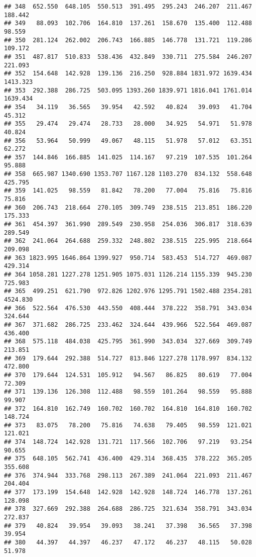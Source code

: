 \documentclass[
]{article}
\begin{document}
\begin{verbatim}
## 348  652.550  648.105  550.513  391.495  295.243  246.207  211.467  188.442
## 349   88.093  102.706  164.810  137.261  158.670  135.400  112.488   98.559
## 350  281.124  262.002  206.743  166.885  146.778  131.721  119.286  109.172
## 351  487.817  510.833  538.436  432.849  330.711  275.584  246.207  221.093
## 352  154.648  142.928  139.136  216.250  928.884 1831.972 1639.434 1413.323
## 353  292.388  286.725  503.095 1393.260 1839.971 1816.041 1761.014 1639.434
## 354   34.119   36.565   39.954   42.592   40.824   39.093   41.704   45.312
## 355   29.474   29.474   28.733   28.000   34.925   54.971   51.978   40.824
## 356   53.964   50.999   49.067   48.115   51.978   57.012   63.351   62.272
## 357  144.846  166.885  141.025  114.167   97.219  107.535  101.264   95.888
## 358  665.987 1340.690 1353.707 1167.128 1103.270  834.132  558.648  425.795
## 359  141.025   98.559   81.842   78.200   77.004   75.816   75.816   75.816
## 360  206.743  218.664  270.105  309.749  238.515  213.851  186.220  175.333
## 361  454.397  361.990  289.549  230.958  254.036  306.817  318.639  289.549
## 362  241.064  264.688  259.332  248.802  238.515  225.995  218.664  209.098
## 363 1823.995 1646.864 1399.927  950.714  583.453  514.727  469.087  429.314
## 364 1058.281 1227.278 1251.905 1075.031 1126.214 1155.339  945.230  725.983
## 365  499.251  621.790  972.826 1202.976 1295.791 1502.488 2354.281 4524.830
## 366  522.564  476.530  443.550  408.444  378.222  358.791  343.034  324.644
## 367  371.682  286.725  233.462  324.644  439.966  522.564  469.087  436.400
## 368  575.118  484.038  425.795  361.990  343.034  327.669  309.749  213.851
## 369  179.644  292.388  514.727  813.846 1227.278 1178.997  834.132  472.800
## 370  179.644  124.531  105.912   94.567   86.825   80.619   77.004   72.309
## 371  139.136  126.308  112.488   98.559  101.264   98.559   95.888   99.907
## 372  164.810  162.749  160.702  160.702  164.810  164.810  160.702  148.724
## 373   83.075   78.200   75.816   74.638   79.405   98.559  121.021  121.021
## 374  148.724  142.928  131.721  117.566  102.706   97.219   93.254   90.655
## 375  648.105  562.741  436.400  429.314  368.435  378.222  365.205  355.608
## 376  374.944  333.768  298.113  267.389  241.064  221.093  211.467  204.404
## 377  173.199  154.648  142.928  142.928  148.724  146.778  137.261  128.098
## 378  327.669  292.388  264.688  286.725  321.634  358.791  343.034  272.837
## 379   40.824   39.954   39.093   38.241   37.398   36.565   37.398   39.954
## 380   44.397   44.397   46.237   47.172   46.237   48.115   50.028   51.978

\end{verbatim}
\end{document}
